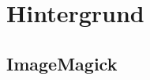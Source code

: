 \chapter{Hintergrund}\label{ch:hintergrund}





\newpage
\section{ImageMagick}\label{sec:imagemagick2}

